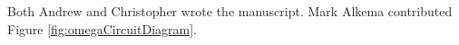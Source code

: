 Both Andrew and Christopher wrote the manuscript. Mark Alkema contributed Figure \ref{fig:omegaCircuitDiagram}.

